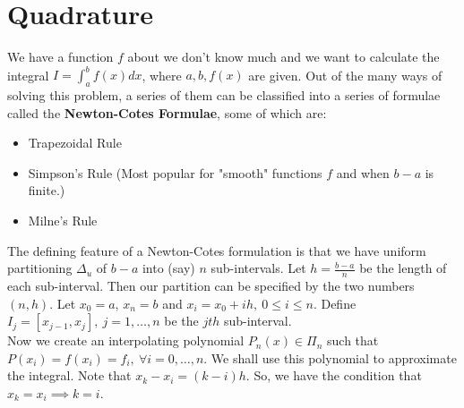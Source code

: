 

\section{Quadrature}

We have a function $f$ about we don't know much and we want to calculate the integral 
$I = \int_a^b f(x) dx$, where  $a,b,f(x)$ are given. Out of the many ways of solving this 
problem, a series of them can be classified into a series of formulae called the 
\textbf{Newton-Cotes Formulae}, some of which are:
\begin{itemize}
    \item Trapezoidal Rule
    \item Simpson's Rule (Most popular for "smooth" functions $f$ and when  $b-a$ is finite.)
    \item Milne's Rule
\end{itemize}

The defining feature of a Newton-Cotes formulation is that we have uniform partitioning 
$\Delta _u$ of  $b-a$ into (say)  $n$ sub-intervals. Let  $h = \frac{b-a}{n}$ be the length of
each sub-interval. Then our partition can be specified by the two numbers $(n,h)$. 
Let $x_0 = a$, $x_n = b$ and  $x_i = x_0 + ih,\ 0 \le  i \le  n$. 
Define $I_j = [x_{j-1}, x_j],\ j = 1,\ldots,n$ be the $jth$ sub-interval.
\\
Now we create an interpolating polynomial $P_n(x) \in \Pi _n$ such that  
$P(x_i) = f(x_i) = f_i,\ \forall i = 0,\ldots,n$. We shall use this polynomial to approximate
the integral.
Note that $x_k - x_i = (k-i)h$. So, we have the condition that $x_k = x_i \implies k = i$.


